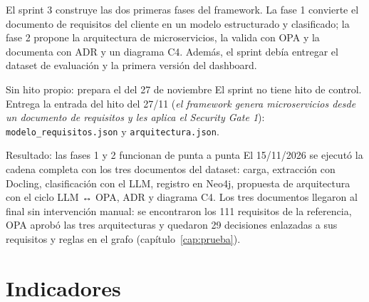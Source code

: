 \documentclass[11pt,a4paper]{report}
\begin{document}
El sprint 3 construye las dos primeras fases del framework. La fase 1 convierte el documento de
requisitos del cliente en un modelo estructurado y clasificado; la fase 2 propone la arquitectura
de microservicios, la valida con OPA y la documenta con ADR y un diagrama C4. Además, el sprint
debía entregar el dataset de evaluación y la primera versión del dashboard.

\begin{cajaazul}{Sin hito propio: prepara el del 27 de noviembre}
El sprint no tiene hito de control. Entrega la entrada del hito del 27/11 (\emph{el framework
genera microservicios desde un documento de requisitos y les aplica el Security Gate 1}):
\texttt{modelo\_requisitos.json} y \texttt{arquitectura.json}.
\end{cajaazul}

\begin{cajaverde}{Resultado: las fases 1 y 2 funcionan de punta a punta}
El 15/11/2026 se ejecutó la cadena completa con los tres documentos del dataset: carga,
extracción con Docling, clasificación con el LLM, registro en Neo4j, propuesta de arquitectura con
el ciclo LLM ↔ OPA, ADR y diagrama C4. Los tres documentos llegaron al final sin intervención
manual: se encontraron los 111 requisitos de la referencia, OPA aprobó las tres arquitecturas y
quedaron 29 decisiones enlazadas a sus requisitos y reglas en el grafo (capítulo~\ref{cap:prueba}).
\end{cajaverde}

\section{Indicadores}
\end{document}
